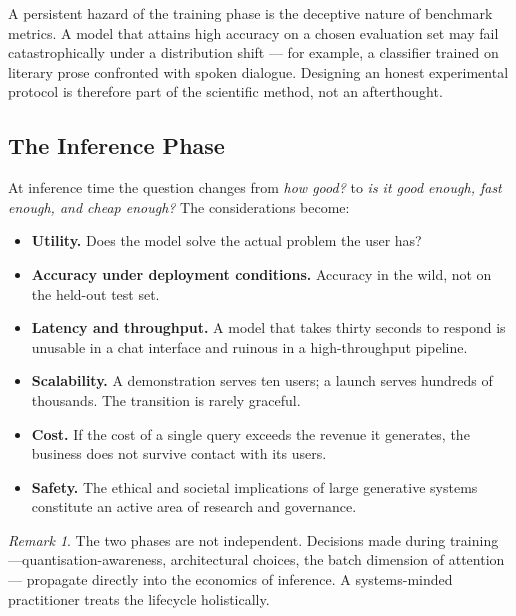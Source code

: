 \documentclass[11pt,a4paper]{article}
\theoremstyle{definition}
\theoremstyle{remark}
\newtheorem*{remark}{Remark}
\theoremstyle{plain}
\begin{document}
A persistent hazard of the training phase is the deceptive nature of
benchmark metrics. A model that attains high accuracy on a chosen
evaluation set may fail catastrophically under a distribution shift
--- for example, a classifier trained on literary prose confronted
with spoken dialogue. Designing an honest experimental protocol is
therefore part of the scientific method, not an afterthought.

\subsection{The Inference Phase}

At inference time the question changes from \emph{how good?} to
\emph{is it good enough, fast enough, and cheap enough?} The
considerations become:

\begin{itemize}[leftmargin=1.5em, itemsep=2pt]
    \item \textbf{Utility.} Does the model solve the actual problem
          the user has?
    \item \textbf{Accuracy under deployment conditions.} Accuracy in
          the wild, not on the held-out test set.
    \item \textbf{Latency and throughput.} A model that takes thirty
          seconds to respond is unusable in a chat interface and
          ruinous in a high-throughput pipeline.
    \item \textbf{Scalability.} A demonstration serves ten users; a
          launch serves hundreds of thousands. The transition is
          rarely graceful.
    \item \textbf{Cost.} If the cost of a single query exceeds the
          revenue it generates, the business does not survive contact
          with its users.
    \item \textbf{Safety.} The ethical and societal implications of
          large generative systems constitute an active area of
          research and governance.
\end{itemize}

\begin{remark}
The two phases are not independent. Decisions made during training
---quantisation-awareness, architectural choices, the batch dimension
of attention --- propagate directly into the economics of inference.
A systems-minded practitioner treats the lifecycle holistically.
\end{remark}

\end{document}
